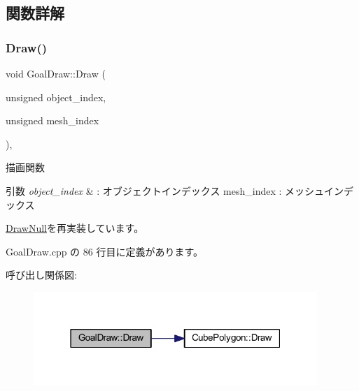 \subsection{関数詳解}
\mbox{\label{class_goal_draw_a554c826d7a4534ee489dfe18edf7ee0e}} 
\subsubsection{\texorpdfstring{Draw()}{Draw()}}
{\footnotesize\ttfamily void Goal\+Draw\+::\+Draw (\begin{DoxyParamCaption}\item[{unsigned}]{object\+\_\+index,  }\item[{unsigned}]{mesh\+\_\+index }\end{DoxyParamCaption})\hspace{0.3cm}{\ttfamily [override]}, {\ttfamily [virtual]}}



描画関数 


\begin{DoxyParams}{引数}
{\em object\+\_\+index} & \+: オブジェクトインデックス mesh\+\_\+index \+: メッシュインデックス \\
\hline
\end{DoxyParams}


\mbox{\hyperlink{class_draw_null_afe50f6fd820b18d673f70f048743f339}{Draw\+Null}}を再実装しています。



 Goal\+Draw.\+cpp の 86 行目に定義があります。

呼び出し関係図\+:\nopagebreak
\begin{figure}[H]
\begin{center}
\leavevmode
\includegraphics[width=304pt]{class_goal_draw_a554c826d7a4534ee489dfe18edf7ee0e_cgraph}
\end{center}
\end{figure}
\mbox{\label{class_goal_draw_a47baf72f8c1c961176610f161069b8d1}} 
